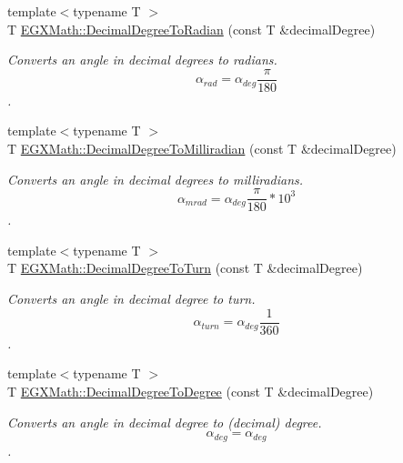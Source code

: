 \begin{DoxyCompactItemize}
\item 
{\footnotesize template$<$typename T $>$ }\\T \mbox{\hyperlink{group___e_g_x_math-_angle_conversions-_decimal_degree_ga906ee2c83cdf4caa59eb613dc2d5d52a}{E\+G\+X\+Math\+::\+Decimal\+Degree\+To\+Radian}} (const T \&decimal\+Degree)
\begin{DoxyCompactList}\small\item\em Converts an angle in decimal degrees to radians. \[\alpha_{rad}=\alpha_{deg}\frac{\pi}{180}\]. \end{DoxyCompactList}\item 
{\footnotesize template$<$typename T $>$ }\\T \mbox{\hyperlink{group___e_g_x_math-_angle_conversions-_decimal_degree_gab567d02d4692d9642a4ad219e479713a}{E\+G\+X\+Math\+::\+Decimal\+Degree\+To\+Milliradian}} (const T \&decimal\+Degree)
\begin{DoxyCompactList}\small\item\em Converts an angle in decimal degrees to milliradians. \[\alpha_{mrad}=\alpha_{deg}\frac{\pi}{180}*10^3\]. \end{DoxyCompactList}\item 
{\footnotesize template$<$typename T $>$ }\\T \mbox{\hyperlink{group___e_g_x_math-_angle_conversions-_decimal_degree_ga396a13c10acdef5026c12f3217b142c1}{E\+G\+X\+Math\+::\+Decimal\+Degree\+To\+Turn}} (const T \&decimal\+Degree)
\begin{DoxyCompactList}\small\item\em Converts an angle in decimal degree to turn. \[\alpha_{turn}=\alpha_{deg}\frac{1}{360}\]. \end{DoxyCompactList}\item 
{\footnotesize template$<$typename T $>$ }\\T \mbox{\hyperlink{group___e_g_x_math-_angle_conversions-_decimal_degree_ga0aa7f2f5dbb00cf4ab303421c6e33ccf}{E\+G\+X\+Math\+::\+Decimal\+Degree\+To\+Degree}} (const T \&decimal\+Degree)
\begin{DoxyCompactList}\small\item\em Converts an angle in decimal degree to (decimal) degree. \[\alpha_{deg}=\alpha_{deg}\]. \end{DoxyCompactList}\item 
\mbox{\label{_decimal_degree_conversion_8inl_afccf9cd779903872887978ab9d79661f}} 

\end{DoxyCompactItemize}
